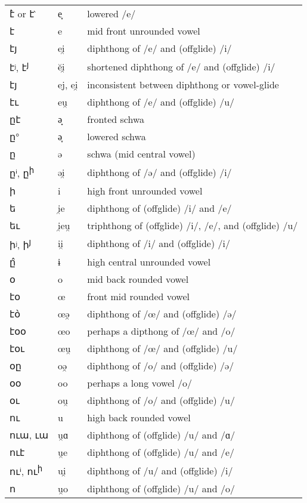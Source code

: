 \begin{center}
\begin{longtable}{|lll|}
		է̀ or է ̀	& 	e̞	& 	lowered /e/	\\
		է	& 	e 	& 	mid front unrounded vowel	\\
		էյ	& 	ei̯	& 	diphthong of /e/ and  (offglide) /i/	\\
		էʲ, է\textsuperscript{յ}	& 	ĕi̯	& 	shortened diphthong of /e/ and (offglide) /i/	\\
		էյ	& 	ej, ei̯	& 	inconsistent between diphthong or vowel-glide	\\
		էւ	& 	eu̯	& 	diphthong of /e/ and  (offglide) /u/	\\
		ըէ	& 	ə̟	& 	fronted schwa	\\
		ը°	& 	ə̞	& 	lowered schwa	\\
		ը	& 	ə 	& 	schwa (mid central vowel)	\\
		ըⁱ,  ը\textsuperscript{ի}	& 	əi̯	& 	diphthong of /ə/ and (offglide) /i/	\\
		ի	& 	i 	& 	high front unrounded vowel	\\
		ե	& 	i̯e	& 	diphthong of (offglide) /i/ and /e/	\\
		եւ	& 	i̯eu̯	& 	triphthong of (offglide) /i/, /e/, and (offglide) /u/	\\
		իʲ, ի\textsuperscript{յ}	& 	ii̯	& 	diphthong of /i/ and  (offglide) /i/	\\
		ը̂	& 	ɨ	& 	high central unrounded vowel	\\
		օ	& 	o	& 	mid back rounded vowel	\\
		էօ	& 	œ	& 	front mid rounded vowel	\\
		է\`օ	& 	œə̯	& 	diphthong of /œ/ and (offglide) /ə/	\\
		էօօ	& 	œo	& 	perhaps a dipthong of /œ/ and /o/	\\
		էօւ	& 	œu̯	& 	diphthong of /œ/ and  (offglide) /u/	\\
		օը	& 	oə̯	& 	diphthong of /o/ and  (offglide) /ə/	\\
		օօ	& 	oo	& 	perhaps a long vowel /o/	\\
		օւ	& 	ou̯	& 	diphthong of /o/ and  (offglide) /u/	\\
		ու	& 	u	& 	high back rounded vowel	\\
		ուա, ւա	& 	u̯ɑ	& 	diphthong of  (offglide) /u/ and /ɑ/	\\
		ուէ	& 	u̯e	& 	diphthong of (offglide) /u/ and /e/	\\
		ուⁱ, ու\textsuperscript{ի}	& 	ui̯	& 	diphthong of /u/ and (offglide) /i/	\\
		ո	& 	u̯o	& 	diphthong of (offglide) /u/ and /o/	
		\\	\hline
	\end{longtable}
\end{center}


